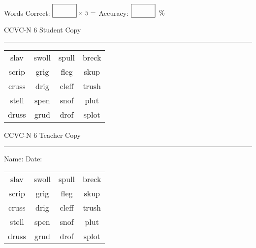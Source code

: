 \documentclass{memoir}
\begin{document}
\small

Words Correct: $\fbox{\phantom{\huge 100}} \times 5 = $ Accuracy: $\fbox{\phantom{\huge 100}}\;\; \%$ 

\vfill

\newpage


\footnotesize \noindent
CCVC-N 6 \hfill Student Copy
\smallskip
\hrule

\Large

\setlength{\tabcolsep}{14pt}
\def\arraystretch{3}

{\selectfont


\begin{vplace}[0.5]
\begin{center}
\begin{tabular}{cccc}
slav & swoll & spull & breck       \\
scrip & grig      & fleg             & skup \\
cruss & drig        & cleff            & trush \\
stell & spen & snof & plut \\
druss & grud & drof & splot \\
\end{tabular}
\end{center}
\end{vplace}

}

\newpage

\footnotesize \noindent
CCVC-N 6 \hfill Teacher Copy
\smallskip
\hrule

\small

\vfill

\noindent
Name: \underline{\hspace{1.75in}} \hfill Date: \underline{\hspace{1in}}

\Large

{\selectfont


\begin{vplace}[0.5]
\begin{center}
\begin{tabular}{cccc}
slav & swoll & spull & breck       \\
scrip & grig      & fleg             & skup \\
cruss & drig        & cleff            & trush \\
stell & spen & snof & plut \\
druss & grud & drof & splot \\
\end{tabular}
\end{center}
\end{vplace}



}
\end{document}
